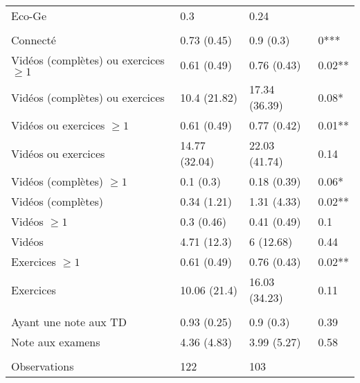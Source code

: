 \documentclass[
]{book}
\begin{document}
\begin{ThreePartTable}
\begin{longtable}[t]{llll}
\hspace{1em}Eco-Ge & 0.3 & 0.24 & \\
\addlinespace[0.3em]
\multicolumn{4}{l}{\textbf{Plateforme}}\\
\hspace{1em}Connecté & 0.73 (0.45) & 0.9 (0.3) & 0***\\
\hspace{1em}Vidéos (complètes) ou exercices $\geq 1$ & 0.61 (0.49) & 0.76 (0.43) & 0.02**\\
\hspace{1em}Vidéos (complètes) ou exercices & 10.4 (21.82) & 17.34 (36.39) & 0.08*\\
\hspace{1em}Vidéos ou exercices $\geq 1$ & 0.61 (0.49) & 0.77 (0.42) & 0.01**\\
\hspace{1em}Vidéos ou exercices & 14.77 (32.04) & 22.03 (41.74) & 0.14\\
\hspace{1em}Vidéos (complètes) $\geq 1$ & 0.1 (0.3) & 0.18 (0.39) & 0.06*\\
\hspace{1em}Vidéos (complètes) & 0.34 (1.21) & 1.31 (4.33) & 0.02**\\
\hspace{1em}Vidéos $\geq 1$ & 0.3 (0.46) & 0.41 (0.49) & 0.1\\
\hspace{1em}Vidéos & 4.71 (12.3) & 6 (12.68) & 0.44\\
\hspace{1em}Exercices $\geq 1$ & 0.61 (0.49) & 0.76 (0.43) & 0.02**\\
\hspace{1em}Exercices & 10.06 (21.4) & 16.03 (34.23) & 0.11\\
\addlinespace[0.3em]
\multicolumn{4}{l}{\textbf{Résultats}}\\
\hspace{1em}Ayant une note aux TD & 0.93 (0.25) & 0.9 (0.3) & 0.39\\
\hspace{1em}Note aux examens & 4.36 (4.83) & 3.99 (5.27) & 0.58\\
\addlinespace[0.3em]
\multicolumn{4}{l}{\textbf{ }}\\
\hspace{1em}\hspace{1em}Observations & 122 & 103 & \\*
\end{longtable}
\end{ThreePartTable}
\endgroup{}
\end{document}
